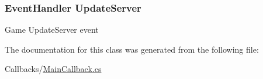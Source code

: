 \subsubsection[{Update\+Server}]{\setlength{\rightskip}{0pt plus 5cm}Event\+Handler Update\+Server\hspace{0.3cm}{\ttfamily [static]}}\label{classOTA_1_1Callbacks_1_1MainCallback_a3ac2eae7803b98d481dfa6cd0105a238}


Game Update\+Server event 



The documentation for this class was generated from the following file\+:\begin{DoxyCompactItemize}
\item 
Callbacks/\hyperlink{MainCallback_8cs}{Main\+Callback.\+cs}\end{DoxyCompactItemize}
